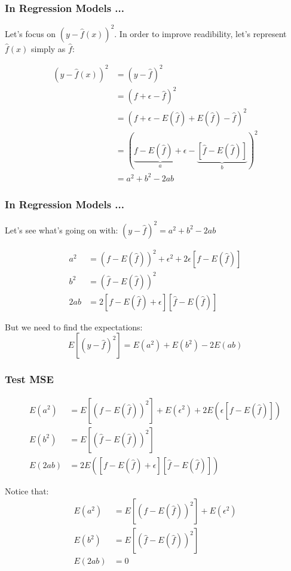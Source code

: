 \documentclass[12pt]{beamer}\usepackage[]{graphicx}\usepackage[]{color}
\begin{document}

\begin{frame}
\frametitle{In Regression Models ...}

Let's focus on $(y - \hat{f}(x))^2$. In order to improve readibility, let's
represent $\hat{f}(x)$ simply as $\hat{f}$:

\begin{align*}
(y - \hat{f}(x))^2 &= (y - \hat{f})^2 \\
&= (f + \epsilon - \hat{f})^2 \\
&= (f + \epsilon - E(\hat{f}) + E(\hat{f}) - \hat{f})^2 \\
&= (\underbrace{f - E(\hat{f}) + \epsilon}_{a} - \underbrace{[\hat{f} - E(\hat{f})]}_{b})^2 \\
&= a^2 + b^2 - 2ab
\end{align*}

\end{frame}


\begin{frame}
\frametitle{In Regression Models ...}

Let's see what's going on with: $(y - \hat{f})^2 = a^2 + b^2 - 2ab$

\begin{align*}
a^2 &= (f - E(\hat{f}))^2 + \epsilon^2 + 2 \epsilon [f - E(\hat{f})] \\
b^2 &= (\hat{f} - E(\hat{f}))^2 \\
2ab &= 2 [f - E(\hat{f}) + \epsilon] [\hat{f} - E(\hat{f})]
\end{align*}

But we need to find the expectations:
$$
E [(y - \hat{f})^2] = E(a^2) + E(b^2) - 2E(ab)
$$

\end{frame}


\begin{frame}
\frametitle{Test MSE}

\begin{align*}
E(a^2) &= E \left [(f - E(\hat{f}))^2 \right ] + E(\epsilon^2) + 2 E(\epsilon [f - E(\hat{f})]) \\
E(b^2) &= E \left [(\hat{f} - E(\hat{f}))^2 \right ] \\
E(2ab) &= 2 E \left ([f - E(\hat{f}) + \epsilon] [\hat{f} - E(\hat{f})] \right )
\end{align*}

Notice that:
\begin{align*}
E(a^2) &= E \left [(f - E(\hat{f}))^2 \right ] + E(\epsilon^2) \\
E(b^2) &= E \left [(\hat{f} - E(\hat{f}))^2 \right ] \\
E(2ab) &= 0
\end{align*}

\end{frame}
\end{document}

